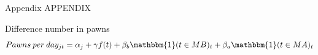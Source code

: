 \documentclass[8pt]{beamer}
\begin{document}
\begin{frame}{Appendix}
\vfill \centering APPENDIX
\end{frame}




\begin{frame}{Difference number in pawns}
    \[Pawns \: per \: day_{jt} = \alpha_j + \gamma f(t) + \beta_b \mathbbm{1}(t \in MB)_{t} +\beta_a \mathbbm{1}(t \in MA)_{t}\]
    
    \begin{table}[H]
\caption{Number of pawns balance before and after the experiment}
\label{num_pawns_bal}
\begin{center}
\small{}
\end{center}
\end{table}

\hyperlink{consort}{}
\end{frame}
\end{document}
